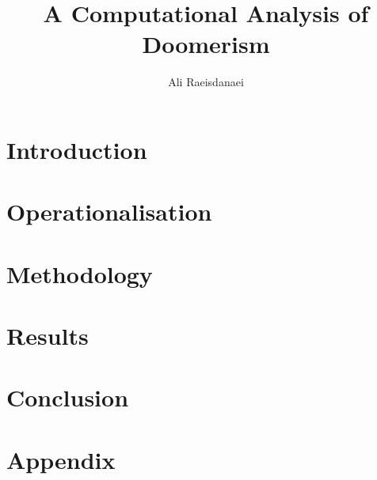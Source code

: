 \documentclass{article}
\begin{document}

\title{A Computational Analysis of Doomerism}
\author{Ali Raeisdanaei}
\maketitle

\begin{multicols}{2}
\section{Introduction}


\section{Operationalisation}


\section{Methodology}


\section{Results}


\section{Conclusion}


\end{multicols}

\printbibliography

\section{Appendix} \label{appendix}

\end{document}
